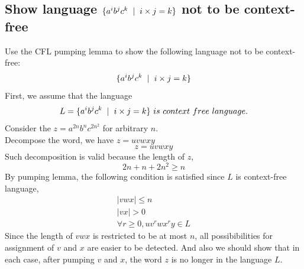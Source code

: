 \documentclass[11pt,a4paper]{article}
\newcommand{\htab}{\hspace*{0.63cm}}
\newcommand{\ba}{\hspace*{0.2cm} | \hspace*{0.2cm}}
\begin{document}
\subsection{Show language $ \{ a^{i} b^{j} c^{k} \ba i \times j = k \} $ not to be context-free}
\htab Use the CFL pumping lemma to show the following language not to be context-free: 
    $$ \{ a^{i} b^{j} c^{k} \ba i \times j = k \} $$ 
\htab First, we assume that the language 
    \begin{equation} \label{pp:assumption}
        L = \{ a^{i} b^{j} c^{k} \ba i \times j = k \}\ is\ context\ free\ language. 
    \end{equation}
\htab Consider the $ z = a^{2n} b^{n} c^{ 2n^{2} } $ for arbitrary $n$. \\
\htab Decompose the word, we have $ z = uvwxy $ 
    \begin{equation} z = uvwxy \end{equation}
\htab Such decomposition is valid because the length of $z$,
    \begin{equation} 2n+n+2n^{2} \geq n \end{equation}
\htab By pumping lemma, the following condition is satisfied since $L$ is context-free language, 
    \begin{align}
        |vwx| \leq n  \label{pp:lessthann} \\
        |vx| > 0  \label{pp:nonzero} \\
        \forall r \geq 0, uv^{r}wx^{r}y \in L \label{pp:pump}
    \end{align}
\htab Since the length of $vwx$ is restricted to be at most $n$, all possibibilities for assignment of $v$ and $x$ are easier to be detected. And also we should show that in each case, after pumping $v$ and $x$, the word $z$ is no longer in the language $L$.
\end{document}
